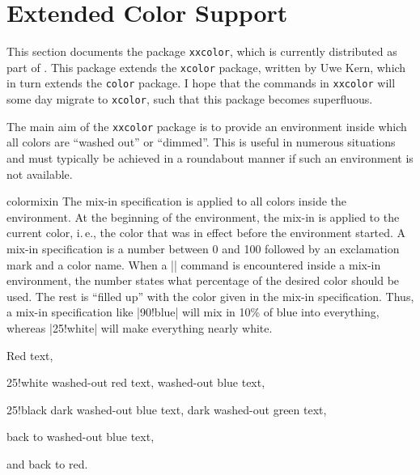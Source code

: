 %
%
%


\section{Extended Color Support}

This section documents the package \texttt{xxcolor}, which is currently
distributed as part of \pgfname. This package extends the \texttt{xcolor}
package, written by Uwe Kern, which in turn extends the \texttt{color} package.
I hope that the commands in \texttt{xxcolor} will some day migrate to
\texttt{xcolor}, such that this package becomes superfluous.

The main aim of the \texttt{xxcolor} package is to provide an environment
inside which all colors are ``washed out'' or ``dimmed''. This is useful in
numerous situations and must typically be achieved in a roundabout manner if
such an environment is not available.

\begin{environment}{{colormixin}}
    The mix-in specification is applied to all colors inside the environment.
    At the beginning of the environment, the mix-in is applied to the current
    color, i.\,e., the color that was in effect before the environment started.
    A mix-in specification is a number between 0 and 100 followed by an
    exclamation mark and a color name. When a |\color| command is encountered
    inside a mix-in environment, the number states what percentage of the
    desired color should be used. The rest is ``filled up'' with the color
    given in the mix-in specification. Thus, a mix-in specification like
    |90!blue| will mix in 10\% of blue into everything, whereas |25!white| will
    make everything nearly white.
\begin{codeexample}[width=4cm]
\begin{minipage}{3.5cm}\raggedright
\color{red}Red text,%
\begin{colormixin}{25!white}
  washed-out red text,
  \color{blue} washed-out blue text,
  \begin{colormixin}{25!black}
    dark washed-out blue text,
    \color{green} dark washed-out green text,%
  \end{colormixin}
  back to washed-out blue text,%
\end{colormixin}
and back to red.
\end{minipage}%
\end{codeexample}
\end{environment}

